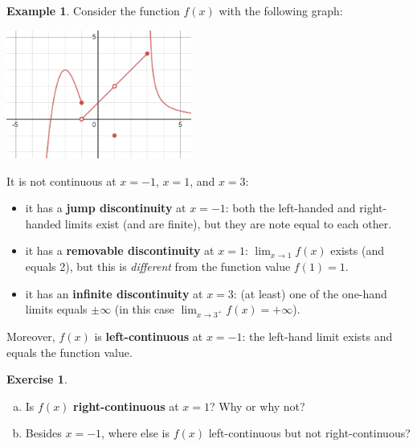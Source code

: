 \documentclass[11pt,reqno,final]{amsart}
\numberwithin{equation}{section}
\numberwithin{figure}{section}
\theoremstyle{definition} %
\newtheorem{example}[equation]{Example}%
\newtheorem{exercise}[question]{Exercise}
\begin{document}
\begin{example}
        Consider the function $f(x)$ with the following graph:
        \begin{center}
                \includegraphics[width=2.4in]{09-25P_graph}
        \end{center}
        It is not continuous at $x=-1$, $x=1$, and $x=3$:
        \begin{itemize}
        \item it has a \textbf{jump discontinuity} at $x=-1$: both the left-handed and right-handed limits exist (and are finite), but they are note equal to each other.
        \item it has a \textbf{removable discontinuity} at $x=1$: $\lim_{x \to 1} f(x)$ exists (and equals 2), but this is \textit{different} from the function value $f(1) = 1$.
        \item it has an \textbf{infinite discontinuity} at $x=3$: (at least) one of the one-hand limits equals $\pm \infty$ (in this case $\lim_{x \to 3^+}f(x) = +\infty$).
        \end{itemize}
        Moreover, $f(x)$ is \textbf{left-continuous} at $x=-1$: the left-hand limit exists and equals the function value.
\end{example}

\begin{exercise}
        \begin{enumerate}[(a)]
        \item Is $f(x)$ \textbf{right-continuous} at $x=1$? Why or why not?
        \item Besides $x=-1$, where else is $f(x)$ left-continuous but not right-continuous?
        \end{enumerate}
\end{exercise}

\newpage
\end{document}
